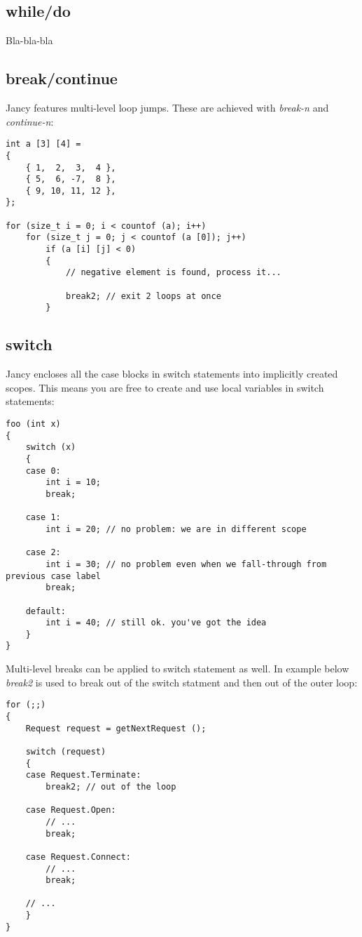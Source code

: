 \documentclass[oneside]{book}
\begin{document}
\subsection{while/do}

Bla-bla-bla

\subsection{break/continue}

Jancy features multi-level loop jumps. These are achieved with \emph{break-n} and \emph{continue-n}:

\begin{lstlisting}
int a [3] [4] = 
{
    { 1,  2,  3,  4 },
    { 5,  6, -7,  8 },
    { 9, 10, 11, 12 },
};

for (size_t i = 0; i < countof (a); i++)
    for (size_t j = 0; j < countof (a [0]); j++)
        if (a [i] [j] < 0)
        {
            // negative element is found, process it...

            break2; // exit 2 loops at once
        }
\end{lstlisting}

\subsection{switch}

Jancy encloses all the case blocks in switch statements into implicitly created scopes. This means you are free to create and use local variables in switch statements:

\begin{lstlisting}
foo (int x)
{
    switch (x)
    {
    case 0:
        int i = 10;
        break;

    case 1:
        int i = 20; // no problem: we are in different scope
    
    case 2:
        int i = 30; // no problem even when we fall-through from previous case label
        break;

    default:
        int i = 40; // still ok. you've got the idea
    }
}
\end{lstlisting}

Multi-level breaks can be applied to switch statement as well. In example below \emph{break2} is used to break out of the switch statment and then out of the outer loop:

\begin{lstlisting}
for (;;)
{
    Request request = getNextRequest ();

    switch (request)
    {
    case Request.Terminate:
        break2; // out of the loop

    case Request.Open:
        // ...
        break;

    case Request.Connect:
        // ...
        break;

    // ...
    }   
}
\end{lstlisting}
\end{document}
